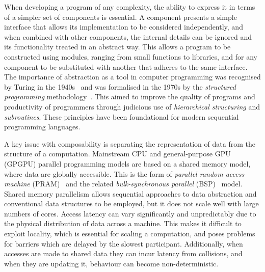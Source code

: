 \documentclass[11pt, conference, compsocconf, onecolumn]{IEEEtran}
\begin{document}
When developing a program of any complexity, the ability to express it in terms
of a simpler set of components is essential. A component presents a simple
interface that allows its implementation to be considered independently, and
when combined with other components, the internal details can be ignored and
its functionality treated in an abstract way. This allows a program to be
constructed using modules, ranging from small functions to libraries, and for
any component to be substituted with another that adheres to the same
interface.
The importance of abstraction as a tool in computer programming was recognised
by Turing in the 1940s~\cite{Turing46} and was formalised in the 1970s by the
\emph{structured programming} methodology~\cite{Dahl72}. This aimed to improve
the quality of programs and productivity of programmers through judicious use
of \emph{hierarchical structuring} and \emph{subroutines}.  These principles
have been foundational for modern sequential programming languages.

A key issue with composability is separating the representation of data from
the structure of a computation. 
Mainstream CPU and general-purpose GPU (GPGPU) parallel programming models are
based on a shared memory model, where data are globally accessible. This is the
form of \emph{parallel random access machine} (PRAM)~\cite{Fortune78} and the
related \emph{bulk-synchronous parallel} (BSP)~\cite{Valiant90a} model. 
Shared memory parallelism allows sequential approaches to data abstraction and
conventional data structures to be employed, but it does not scale well with
large numbers of cores. 
Access latency can vary significantly and unpredictably due to the physical
distribution of data across a machine. This makes it difficult to exploit
locality, which is essential for scaling a computation, and poses problems for
barriers which are delayed by the slowest participant. Additionally, when
accesses are made to shared data they can incur latency from collisions, and
when they are updating it, behaviour can become non-deterministic.
\end{document}

